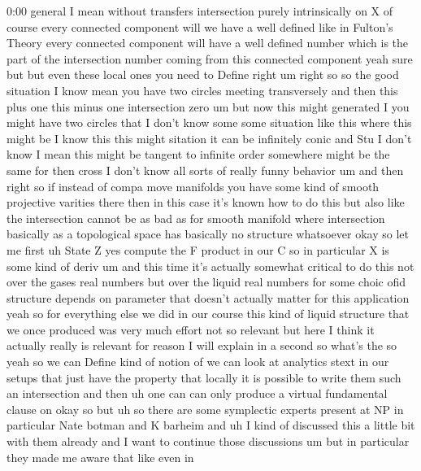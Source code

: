 \begin{unfinished}{0:00}
general  I  mean  without  transfers
intersection  purely  intrinsically  on
X  of  course  every  connected  component
will  we  have  a  well  defined  like  in
Fulton's  Theory  every  connected
component  will  have  a  well  defined
number  which  is  the  part  of  the
intersection
number  coming  from  this  connected
component  yeah
sure  but  but  even  these  local  ones  you
need  to  Define  right  um  right  so  so  the
good  situation  I  know  mean  you  have  two
circles  meeting  transversely  and  then
this  plus  one  this  minus  one
intersection  zero
um  but  now  this  might  generated  I  you
might  have  two
circles  that  I  don't
know  some  some  situation  like  this  where
this  might  be  I  know  this  this
might
sitation  it  can  be  infinitely  conic  and
Stu  I  don't  know  I  mean  this  might  be
tangent  to  infinite  order  somewhere
might  be  the  same  for
then  cross  I  don't  know  all  sorts  of
really  funny  behavior  um  and
then
right  so  if  instead  of  compa  move
manifolds  you  have  some  kind  of  smooth
projective  varities  there  then  in  this
case  it's  known  how  to  do
this  but  also  like  the  intersection
cannot  be  as  bad  as  for  smooth  manifold
where  intersection  basically  as  a
topological  space  has  basically  no
structure
whatsoever
okay  so  let  me  first  uh  State
Z  yes
compute  the  F
product  in  our
C  so  in
particular  X  is  some  kind  of
deriv  um  and  this  time  it's  actually
somewhat  critical  to  do  this  not  over
the  gases  real  numbers  but  over  the
liquid  real
numbers  for  some  choic
ofid  structure  depends  on  parameter  that
doesn't  actually  matter  for  this
application
yeah  so  for  everything  else  we  did  in
our  course  this  kind  of  liquid  structure
that  we  once  produced  was  very  much
effort  not  so  relevant  but  here  I  think
it  actually  really  is  relevant  for
reason  I  will  explain  in  a
second  so  what's  the  so  yeah  so  we  can
Define  kind  of  notion
of  we  can  look  at  analytics  stext  in  our
setups  that  just  have  the  property  that
locally  it  is  possible  to  write  them
such  an  intersection  and  then  uh  one  can
can  only  produce  a  virtual  fundamental
clause
on  okay  so  but  uh  so  there  are  some
symplectic  experts  present  at  NP  in
particular  Nate  botman  and  K  barheim  and
uh  I  kind  of  discussed  this  a  little  bit
with  them  already  and  I  want  to  continue
those  discussions  um  but  in  particular
they  made  me  aware  that  like  even  in

\end{unfinished}
